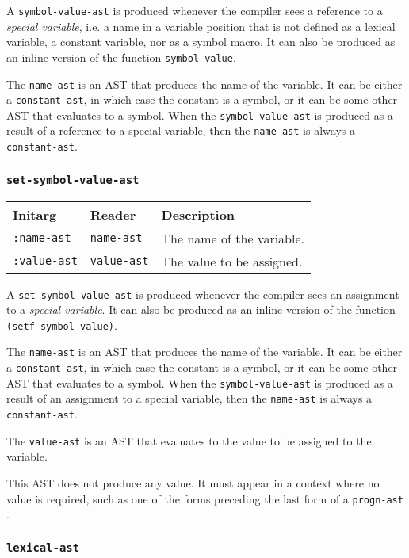 A \texttt{symbol-value-ast} is produced whenever the compiler sees a
reference to a \emph{special variable}, i.e. a name in a variable
position that is not defined as a lexical variable, a constant
variable, nor as a symbol macro.  It can also be produced as an inline
version of the function \texttt{symbol-value}.

The \texttt{name-ast} is an AST that produces the name of the
variable.  It can be either a \texttt{constant-ast}, in which case the
constant is a symbol, or it can be some other AST that evaluates to a
symbol.  When the \texttt{symbol-value-ast} is produced as a result of
a reference to a special variable, then the \texttt{name-ast} is
always a \texttt{constant-ast}.

\subsubsection{\texttt{set-symbol-value-ast}}
\label{set-symbol-value-ast}

\begin{tabular}{|l|l|l|}
\hline
Initarg & Reader & Description\\
\hline\hline
\texttt{:name-ast} & \texttt{name-ast} & The name of the variable.\\
\hline
\texttt{:value-ast} & \texttt{value-ast} & The value to be assigned.\\
\hline
\end{tabular}

A \texttt{set-symbol-value-ast} is produced whenever the compiler sees
an assignment to a \emph{special variable}.  It can also be produced
as an inline version of the function \texttt{(setf symbol-value)}.

The \texttt{name-ast} is an AST that produces the name of the
variable.  It can be either a \texttt{constant-ast}, in which case the
constant is a symbol, or it can be some other AST that evaluates to a
symbol.  When the \texttt{symbol-value-ast} is produced as a result of
an assignment to a special variable, then the \texttt{name-ast} is
always a \texttt{constant-ast}.

The \texttt{value-ast} is an AST that evaluates to the value to be
assigned to the variable.

This AST does not produce any value.  It must appear in a context
where no value is required, such as one of the forms preceding the
last form of a \texttt{progn-ast} .

\subsubsection{\texttt{lexical-ast}}
\label{lexical-ast}

